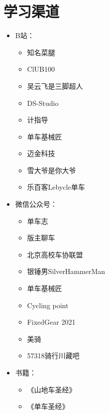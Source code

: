 \documentclass{ctexbook}
\begin{document}
\section{学习渠道}
\begin{center}
    \begin{tcolorbox}[title=一些推荐的线上资源,text width = 0.8\linewidth]
        \begin{itemize}
            \item B站：
            \begin{itemize}
                \item 知名菜腿
                \item ClUB100
                \item 吴云飞是三脚超人
                \item DS-Studio 
                \item 计指导
                \item 单车基械匠
                \item 迈金科技
                \item 雪大爷是你大爷
                \item 乐百客Lebycle单车
            \end{itemize}
            \item 微信公众号：
            \begin{itemize}
                \item 单车志
                \item 版主聊车
                \item 北京高校车协联盟
                \item 银锤男SilverHammerMan 
                \item 单车基械匠
                \item Cycling point
                \item FixedGear 2021
                \item 美骑
                \item 57318骑行川藏吧           
            \end{itemize}
            \item 书籍：
            \begin{itemize}
                \item《山地车圣经》
                \item《单车圣经》
            \end{itemize}  
        \end{itemize}
    \end{tcolorbox}
\end{center}
\end{document}
